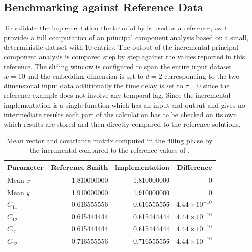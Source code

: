 \subsection{Benchmarking against Reference Data}
\label{section:Against reference data}
To validate the implementation the tutorial by \cite{CheckForCorectness} is used as a reference, as it provides a full computation of an principal component analysis based on a small, deterministic dataset with 10 entries. The output of the incremental principal component analysis is compared step by step against the values reported in this reference. The sliding window is configured to span the entire input dataset $w = 10$ and the embedding dimension is set to $d =2$ corresponding to the two-dimensional input data additionally the time delay is set to $\tau = 0$ since the reference example does not involve any temporal lag. Since the incremental implementation is a single function which has an input and output and gives no intermediate results each part of the calculation has to be checked on its own which results are stored and then directly compared to the reference solutions.
\begin{table}[H]
    \centering
    \begin{tabular}{lrrr}
        \toprule
        Parameter & Reference Smith & Implementation & Difference \\
        \midrule
        Mean $x$          & 1.810000000 & 1.810000000 & 0 \\
        Mean $y$          & 1.910000000 & 1.910000000 & 0 \\
        $C_{11}$          & 0.616555556 & 0.616555556 & $4.44 \times 10^{-10}$ \\
        $C_{12}$ & 0.615444444 & 0.615444444 & $4.44 \times 10^{-10}$ \\
        $C_{21}$ & 0.615444444 & 0.615444444 & $4.44 \times 10^{-10}$ \\
        $C_{22}$          & 0.716555556 & 0.716555556 & $4.44 \times 10^{-10}$ \\
        \bottomrule
    \end{tabular}
    \caption{Mean vector and covariance matrix computed in the filling phase by the incremental compared to the reference values of \citet{CheckForCorectness}.}
    \label{tab:CheckMeanCov}
\end{table}

